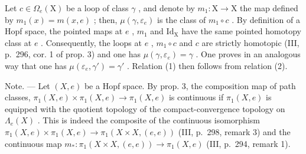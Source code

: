 Let \(c \in \Omega_e(\mathrm{X})\) be a loop of class \(\gamma\) , and denote by \(m_1 \colon \mathrm{X} \to \mathrm{X}\) the map defined by \(m_1(x) = m(x, e)\) ; then, \(\mu(\gamma, \varepsilon_e)\) is the class of \(m_1 \circ c\) . By definition of a Hopf space, the pointed maps at \(e\) , \(m_1\) and \(\mathrm{Id_X}\) have the same pointed homotopy class at \(e\) . Consequently, the loops at \(e\) , \(m_1 \circ c\) and \(c\) are strictly homotopic (III, p.~296, cor. 1 of prop. 3) and one has \(\mu(\gamma, \varepsilon_e) = \gamma\) . One proves in an analogous way that one has \(\mu(\varepsilon_e, \gamma') = \gamma'\) . Relation (1) then follows from relation (2).

Note. --- Let \((X,e)\) be a Hopf space. By prop. 3, the composition map of path classes, \(\pi_{1}(X,e)\times\pi_{1}(X,e)\to\pi_{1}(X,e)\) is continuous if \(\pi_{1}(X,e)\) is equipped with the quotient topology of the compact-convergence topology on \(\Lambda_{e}(X)\) . This is indeed the composite of the continuous isomorphism \(\pi_{1}(X,e)\times\pi_{1}(X,e)\to\pi_{1}(X\times X,(e,e))\) (III, p.~298, remark 3) and the continuous map \(m_{*}:\pi_{1}(X\times X,(e,e))\to\pi_{1}(X,e)\) (III, p.~294, remark 1).

